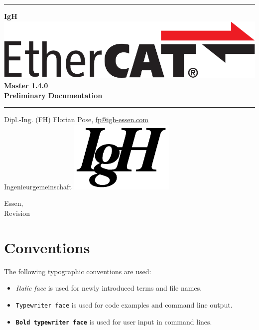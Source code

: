 \documentclass[a4paper,12pt,BCOR6mm,bibtotoc,idxtotoc]{scrbook}
\makeatletter
\renewcommand*{\lstlistoflistings}{%
  \begingroup
    \if@twocolumn
      \@restonecoltrue\onecolumn
    \else
      \@restonecolfalse
    \fi
    \lol@heading
    \setlength{\parskip}{\z@}%
    \setlength{\parindent}{\z@}%
    \setlength{\parfillskip}{\z@ \@plus 1fil}%
    \@starttoc{lol}%
    \if@restonecol\twocolumn\fi
  \endgroup
}
\newcommand{\IgH}{\raisebox{-0.7667ex}
  {\includegraphics[height=2.2ex]{images/ighsign}}}
\newcommand{\masterversion}{1.4.0}
\makeatother
\begin{document}
\pagestyle{empty}

\begin{titlepage}
  \begin{center}
    \rule{\textwidth}{1.5mm}

    {\Huge\bf IgH \includegraphics[height=2.4ex]{images/ethercat}
      Master \masterversion\\[1ex]
      Preliminary Documentation}

    \vspace{1ex}
    \rule{\textwidth}{1.5mm}

    \vspace{\fill} {\Large Dipl.-Ing. (FH) Florian Pose,
    \url{fp@igh-essen.com}\\[1ex] Ingenieurgemeinschaft \IgH}

    \vspace{\fill}
    {\Large Essen, \SVNDate\\[1ex]
      Revision \SVNRevision}
  \end{center}
\end{titlepage}


\tableofcontents
\listoftables
\listoffigures


\newpage
\pagestyle{scrheadings}

\section*{Conventions}

The following typographic conventions are used:

\begin{itemize}

\item \textit{Italic face} is used for newly introduced terms and file names.

\item \texttt{Typewriter face} is used for code examples and command line
output.

\item \texttt{\textbf{Bold typewriter face}} is used for user input in command
lines.

\end{itemize}
\end{document}
